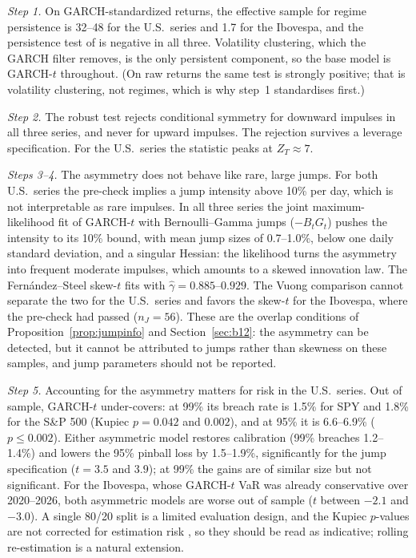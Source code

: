 \documentclass[11pt,a4paper]{article}
\theoremstyle{definition}
\theoremstyle{remark}
\begin{document}
\emph{Step 1.} On GARCH-standardized returns, the effective sample for regime persistence is 32--48 for the U.S.\ series and 1.7 for the Ibovespa, and the persistence test of \citet{giornoA} is negative in all three. Volatility clustering, which the GARCH filter removes, is the only persistent component, so the base model is GARCH-$t$ throughout. (On raw returns the same test is strongly positive; that is volatility clustering, not regimes, which is why step~1 standardises first.)

\emph{Step 2.} The robust test rejects conditional symmetry for downward impulses in all three series, and never for upward impulses. The rejection survives a leverage specification. For the U.S.\ series the statistic peaks at $Z_T\approx7$.

\emph{Steps 3--4.} The asymmetry does not behave like rare, large jumps. For both U.S.\ series the pre-check implies a jump intensity above 10\% per day, which is not interpretable as rare impulses. In all three series the joint maximum-likelihood fit of GARCH-$t$ with Bernoulli--Gamma jumps ($-B_tG_t$) pushes the intensity to its 10\% bound, with mean jump sizes of 0.7--1.0\%, below one daily standard deviation, and a singular Hessian: the likelihood turns the asymmetry into frequent moderate impulses, which amounts to a skewed innovation law. The Fern\'andez--Steel skew-$t$ fits with $\hat\gamma=0.885$--$0.929$. The Vuong comparison cannot separate the two for the U.S.\ series and favors the skew-$t$ for the Ibovespa, where the pre-check had passed ($n_J=56$). These are the overlap conditions of Proposition~\ref{prop:jumpinfo} and Section~\ref{sec:b12}: the asymmetry can be detected, but it cannot be attributed to jumps rather than skewness on these samples, and jump parameters should not be reported.

\emph{Step 5.} Accounting for the asymmetry matters for risk in the U.S.\ series. Out of sample, GARCH-$t$ under-covers: at 99\% its breach rate is 1.5\% for SPY and 1.8\% for the S\&P 500 (Kupiec $p=0.042$ and $0.002$), and at 95\% it is 6.6--6.9\% ($p\le0.002$). Either asymmetric model restores calibration (99\% breaches 1.2--1.4\%) and lowers the 95\% pinball loss by 1.5--1.9\%, significantly for the jump specification ($t=3.5$ and $3.9$); at 99\% the gains are of similar size but not significant. For the Ibovespa, whose GARCH-$t$ VaR was already conservative over 2020--2026, both asymmetric models are worse out of sample ($t$ between $-2.1$ and $-3.0$). A single 80/20 split is a limited evaluation design, and the Kupiec $p$-values are not corrected for estimation risk \citep{escanciano2010}, so they should be read as indicative; rolling re-estimation is a natural extension.
\end{document}
